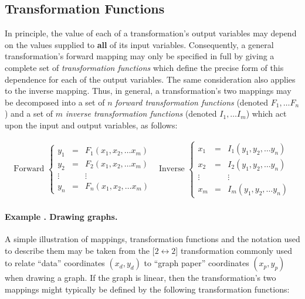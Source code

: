 \documentclass[twoside,11pt]{article}
\newcommand{\xlabel}[1]{}
\newcounter{examplecounter}
\newcommand{\example}[1]{\addtocounter{examplecounter}{1}
                         \paragraph{\textbf{Example \theexamplecounter. #1}}}
\begin{document}
\subsection{\xlabel{transformation_functions}Transformation Functions}

In principle, the value of each of a transformation's output variables may
depend on the values supplied to \textbf{all} of its input variables. 
Consequently, a general transformation's forward mapping may only be
specified in full by giving a complete set of \emph{transformation functions}
which define the precise form of this dependence for each of the output 
variables.
The same consideration also applies to the inverse mapping. 
Thus, in general, a transformation's two mappings may be decomposed into a
set of $n$ \emph{forward transformation functions} (denoted \mbox{$F_1,\ldots
F_n$}) and a set of $m$ \emph{inverse transformation functions} (denoted
\mbox{$I_1,\ldots I_m$}) which act upon the input and output variables, as
follows: 

\begin{equation}
\begin{array}{cc}
\mbox{Forward }
\left\{
\begin{array}{ccc}
y_1 & = & F_1(x_1, x_2,\ldots x_m)\\
y_2 & = & F_2(x_1, x_2,\ldots x_m)\\
\vdots & & \vdots\\
y_n & = & F_n(x_1, x_2,\ldots x_m)
\end{array}
\right.
&
\mbox{Inverse }
\left\{
\begin{array}{ccc}
x_1 & = & I_1(y_1, y_2,\ldots y_n)\\
x_2 & = & I_2(y_1, y_2,\ldots y_n)\\
\vdots & & \vdots\\
x_m & = & I_m(y_1, y_2,\ldots y_n)
\end{array}
\right.
\end{array}
\label{equation:transformationfunctions}
\end{equation}

\example{Drawing graphs.}
A simple illustration of mappings, transformation functions and the notation
used to describe them may be taken from the \mbox{[$2 \leftrightarrow 2$]}
transformation commonly used to relate ``data'' coordinates $(x_d,y_d)$ to
``graph paper'' coordinates $(x_p,y_p)$ when drawing a graph. 
If the graph is linear, then the transformation's two mappings might
typically be defined by the following transformation functions: 
\end{document}
